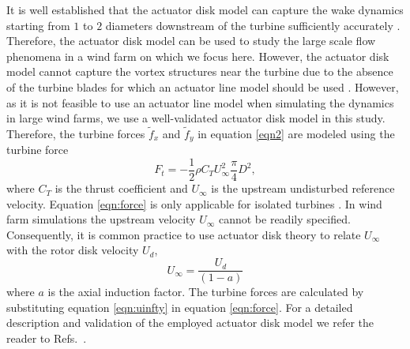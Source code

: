 \documentclass[%
 aip,
 amsmath,amssymb,
preprint,%
author-numerical,%
]{revtex4-1}
\begin{document}
It is well established that the actuator disk model can capture the wake dynamics starting from $1$ to $2$ diameters downstream of the turbine sufficiently accurately \cite{ste17, ste18, wu11}. Therefore, the actuator disk model can be used to study the large scale flow phenomena in a wind farm on which we focus here. However, the actuator disk model cannot capture the vortex structures near the turbine due to the absence of the turbine blades for which an actuator line model should be used \cite{sor11, tro10, ste17}. However, as it is not feasible to use an actuator line model when simulating the dynamics in large wind farms, we use a well-validated actuator disk model \cite{jim07, jim08,cal10, ste14, ste16, zha19,nag19} in this study. Therefore, the turbine forces $\widetilde{f}_x$ and $\widetilde{f}_y$ in equation \eqref{eqn2} are modeled using the turbine force
%
\begin{equation}
 F_t = -\frac{1}{2}\rho{C_T}{U^2_\infty}\frac{\pi}{4}D^2,\label{eqn:force}
\end{equation} 
%
where $C_T$ is the thrust coefficient and $U_\infty$ is the upstream undisturbed reference velocity. Equation \eqref{eqn:force} is only applicable for isolated turbines \cite{jim07, jim08}. In wind farm simulations the upstream velocity $U_\infty$ cannot be readily specified. Consequently, it is common practice \cite{cal10, cal11} to use actuator disk theory to relate $U_\infty$ with the rotor disk velocity $U_d$,
\begin{equation}
U_\infty= \frac{U_d}{\left(1-a\right)}\label{eqn:uinfty}
\end{equation} 
%
where $a$ is the axial induction factor. The turbine forces are calculated by substituting equation \eqref{eqn:uinfty} in equation \eqref{eqn:force}. For a detailed description and validation of the employed actuator disk model we refer the reader to Refs.\ \cite{cal10, cal11,ste18}.
\end{document}
